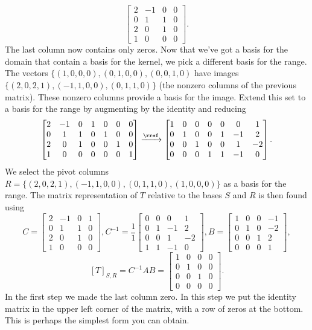 \begin{example}
$$\begin{bmatrix}
 2 & -1 & 0 & 0 \\
 0 & 1 & 1 & 0 \\
 2 & 0 & 1 & 0 \\
 1 & 0 & 0 & 0
\end{bmatrix}.$$ 
The last column now contains only zeros. Now that we've got a basis for the domain that contain a basis for the kernel, we pick a different basis for the range.
The vectors $\{(1,0,0,0),(0,1,0,0),(0,0,1,0)$ have images $\{(2,0,2,1),(-1,1,0,0),(0,1,1,0)\}$ (the nonzero columns of the previous matrix). These nonzero columns provide a basis for the image.  Extend this set to a basis for the range by augmenting by the identity and reducing
$$\begin{bmatrix}
 2 & -1 & 0 & 1 & 0 & 0 & 0 \\
 0 & 1 & 1 & 0 & 1 & 0 & 0 \\
 2 & 0 & 1 & 0 & 0 & 1 & 0 \\
 1 & 0 & 0 & 0 & 0 & 0 & 1
\end{bmatrix}
\xrightarrow{\rref}
\begin{bmatrix}
 1 & 0 & 0 & 0 & 0 & 0 & 1 \\
 0 & 1 & 0 & 0 & 1 & -1 & 2 \\
 0 & 0 & 1 & 0 & 0 & 1 & -2 \\
 0 & 0 & 0 & 1 & 1 & -1 & 0
\end{bmatrix}.
$$ 
We select the pivot columns $R = \{(2,0,2,1),(-1,1,0,0),(0,1,1,0),(1,0,0,0)\}$ as a basis for the range. 
The matrix representation of $T$ relative to the bases $S$ and $R$ is then found using 
$$C=
\begin{bmatrix}
 2 & -1 & 0 & 1 \\
 0 & 1 & 1 & 0 \\
 2 & 0 & 1 & 0 \\
 1 & 0 & 0 & 0
\end{bmatrix},
C^{-1} = \frac{1}{1}
\begin{bmatrix}
 0 & 0 & 0 & 1 \\
 0 & 1 & -1 & 2 \\
 0 & 0 & 1 & -2 \\
 1 & 1 & -1 & 0
\end{bmatrix},
B=
\begin{bmatrix}
 1 & 0 & 0 & -1 \\
 0 & 1 & 0 & -2 \\
 0 & 0 & 1 & 2 \\
 0 & 0 & 0 & 1
\end{bmatrix},$$
$$[T]_{S,R} = C^{-1}AB= 
\begin{bmatrix}
 1 & 0 & 0 & 0 \\
 0 & 1 & 0 & 0 \\
 0 & 0 & 1 & 0 \\
 0 & 0 & 0 & 0
\end{bmatrix}.$$ In the first step we made the last column zero. In this step we put the identity matrix in the upper left corner of the matrix, with a row of zeros at the bottom. 
This is perhaps the simplest form you can obtain.
\end{example}


